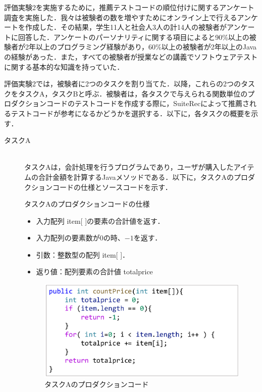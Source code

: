\documentclass[12pt]{jarticle} %
\begin{document}
評価実験2を実施するために，推薦テストコードの順位付けに関するアンケート調査を実施した．我々は被験者の数を増やすためにオンライン上で行えるアンケートを作成した．その結果，学生11人と社会人3人の計14人の被験者がアンケートに回答した．アンケートのパーソナリティに関する項目によると90\%以上の被験者が2年以上のプログラミング経験があり，60\%以上の被験者が2年以上のJavaの経験があった．また，すべての被験者が授業などの講義でソフトウェアテストに関する基本的な知識を持っていた．

評価実験2では，被験者に2つのタスクを割り当てた．以降，これらの2つのタスクをタスクA，タスクBと呼ぶ．被験者は，各タスクで与えられる関数単位のプロダクションコードのテストコードを作成する際に，{\sf SuiteRec}によって推薦されるテストコードが参考になるかどうかを選択する．以下に，各タスクの概要を示す．

\begin{description}
\item[タスクA]~\\
タスクAは，会計処理を行うプログラムであり，ユーザが購入したアイテムの合計金額を計算するJavaメソッドである．以下に，タスクAのプロダクションコードの仕様とソースコードを示す．
\begin{itembox}[l]{タスクAのプロダクションコードの仕様}
\begin{itemize}
\item 入力配列 item[ ]の要素の合計値を返す．
\item 入力配列の要素数が0の時、$-1$を返す．
\item 引数：整数型の配列 item[ ]．
\item 返り値：配列要素の合計値 totalprice
\end{itemize}
\end{itembox}

\begin{figure}[htbp]
  \begin{center}
    \includegraphics[clip,width=12cm]{taskA.pdf}
    \caption{タスクAのプロダクションコード}
    \label{E1}
  \end{center}
\end{figure}


\end{description}
\end{document}
